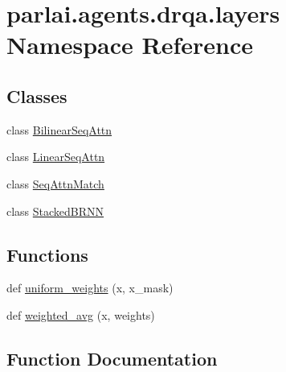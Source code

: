 \hypertarget{namespaceparlai_1_1agents_1_1drqa_1_1layers}{}\section{parlai.\+agents.\+drqa.\+layers Namespace Reference}
\label{namespaceparlai_1_1agents_1_1drqa_1_1layers}
\subsection*{Classes}
\begin{DoxyCompactItemize}
\item 
class \hyperlink{classparlai_1_1agents_1_1drqa_1_1layers_1_1BilinearSeqAttn}{Bilinear\+Seq\+Attn}
\item 
class \hyperlink{classparlai_1_1agents_1_1drqa_1_1layers_1_1LinearSeqAttn}{Linear\+Seq\+Attn}
\item 
class \hyperlink{classparlai_1_1agents_1_1drqa_1_1layers_1_1SeqAttnMatch}{Seq\+Attn\+Match}
\item 
class \hyperlink{classparlai_1_1agents_1_1drqa_1_1layers_1_1StackedBRNN}{Stacked\+B\+R\+NN}
\end{DoxyCompactItemize}
\subsection*{Functions}
\begin{DoxyCompactItemize}
\item 
def \hyperlink{namespaceparlai_1_1agents_1_1drqa_1_1layers_a4ef6f28cb2997c68a15b05137b75dcc4}{uniform\+\_\+weights} (x, x\+\_\+mask)
\item 
def \hyperlink{namespaceparlai_1_1agents_1_1drqa_1_1layers_a8d0e781e00db1c2d843b21a056554f65}{weighted\+\_\+avg} (x, weights)
\end{DoxyCompactItemize}


\subsection{Function Documentation}
\mbox{\label{namespaceparlai_1_1agents_1_1drqa_1_1layers_a4ef6f28cb2997c68a15b05137b75dcc4}} 
